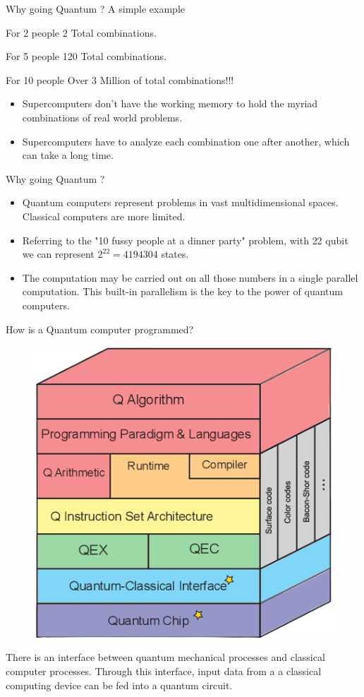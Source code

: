 \begin{frame}[<+- | only+>]{Why going Quantum ? A simple example}
	
	
	\begin{exampleblock}{For 2 people}
		2 Total combinations.
	\end{exampleblock}

	\begin{block}{For 5 people}
		120 Total combinations.
	\end{block}
	

	\begin{alertblock}{For 10 people}
		Over 3 Million of total combinations!!!
	\end{alertblock}	
	
	\begin{itemize}
		\item Supercomputers don't have the working \alert{memory} to hold the myriad combinations of real world problems.
		\item Supercomputers have to analyze each combination one after another, which can take a long \alert{time}.
	\end{itemize}
\end{frame}

\begin{frame}{Why going Quantum ?}
\begin{itemize}
 \item Quantum computers represent problems in vast multidimensional spaces. Classical computers are more limited.
 \item Referring to the "10 fussy people at a dinner party" problem, with \alert{22 qubit} we can represent $2^{22} = 4194304$ states.
    \item The computation may be carried out on all those numbers in a \alert{single parallel computation}. This built-in parallelism is the key to the power of quantum computers.
\end{itemize}
    
\end{frame}


\begin{frame}{How is a Quantum computer programmed?}
\begin{figure}[H]
    \centering
    \includegraphics[width=.4\linewidth]{ Hto8a.png}
\end{figure}
There is an \alert{interface} between quantum mechanical processes and classical computer processes. Through this interface, input data from a a classical computing device can be fed into a quantum circuit.
\end{frame}


